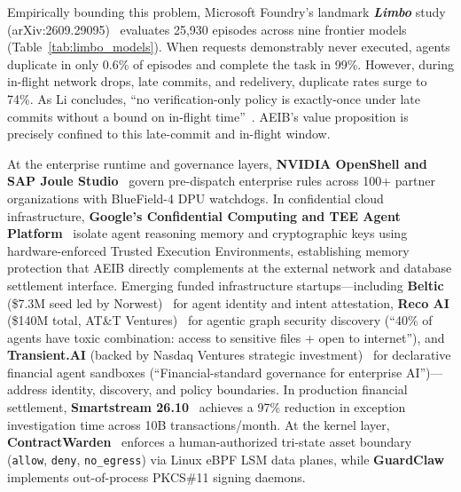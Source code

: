 \documentclass[10pt,journal,compsoc]{IEEEtran}
\begin{document}
Empirically bounding this problem, Microsoft Foundry's landmark \textbf{\emph{Limbo}} study (arXiv:2609.29095)~\cite{limbo2026} evaluates 25,930 episodes across nine frontier models (Table~\ref{tab:limbo_models}). When requests demonstrably never executed, agents duplicate in only 0.6\% of episodes and complete the task in 99\%. However, during in-flight network drops, late commits, and redelivery, duplicate rates surge to 74\%. As Li concludes, ``no verification-only policy is exactly-once under late commits without a bound on in-flight time''~\cite{limbo2026}. AEIB's value proposition is precisely confined to this late-commit and in-flight window.

At the enterprise runtime and governance layers, \textbf{NVIDIA OpenShell and SAP Joule Studio}~\cite{openshell2026} govern pre-dispatch enterprise rules across 100+ partner organizations with BlueField-4 DPU watchdogs. In confidential cloud infrastructure, \textbf{Google's Confidential Computing and TEE Agent Platform}~\cite{googletee2026} isolate agent reasoning memory and cryptographic keys using hardware-enforced Trusted Execution Environments, establishing memory protection that AEIB directly complements at the external network and database settlement interface. Emerging funded infrastructure startups---including \textbf{Beltic} (\$7.3M seed led by Norwest)~\cite{beltic2026} for agent identity and intent attestation, \textbf{Reco AI} (\$140M total, AT\&T Ventures)~\cite{reco2026} for agentic graph security discovery (``40\% of agents have toxic combination: access to sensitive files + open to internet''), and \textbf{Transient.AI} (backed by Nasdaq Ventures strategic investment)~\cite{transient2026} for declarative financial agent sandboxes (``Financial-standard governance for enterprise AI'')---address identity, discovery, and policy boundaries. In production financial settlement, \textbf{Smartstream 26.10}~\cite{smartstream2026} achieves a 97\% reduction in exception investigation time across 10B transactions/month. At the kernel layer, \textbf{ContractWarden}~\cite{contractwarden2026} enforces a human-authorized tri-state asset boundary (\texttt{allow}, \texttt{deny}, \texttt{no\_egress}) via Linux eBPF LSM data planes, while \textbf{GuardClaw}~\cite{guardclaw2026} implements out-of-process PKCS\#11 signing daemons.
\end{document}
